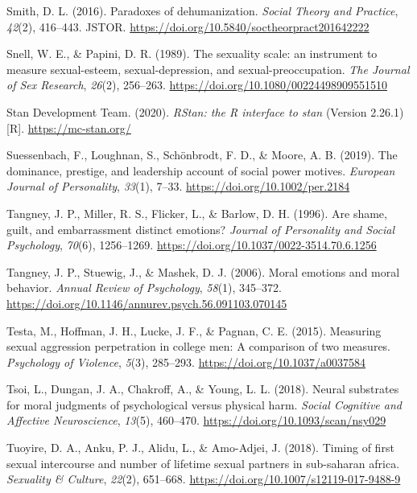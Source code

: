\documentclass[
  donotrepeattitle,doc, 12pt, a4paper,floatsintext]{apa7}
\newlength{\cslhangindent}
\newlength{\cslentryspacingunit} %
\newenvironment{CSLReferences}[2] %
 {%
  \setlength{\parindent}{0pt}
  \ifodd #1
  \let\oldpar\par
  \def\par{\hangindent=\cslhangindent\oldpar}
  \fi
  \setlength{\parskip}{#2\cslentryspacingunit}
 }%
 {}
\begin{document}
\begin{CSLReferences}{1}{0}
\leavevmode{}%
Smith, D. L. (2016). Paradoxes of dehumanization. \emph{Social Theory and Practice}, \emph{42}(2), 416--443. JSTOR. \url{https://doi.org/10.5840/soctheorpract201642222}

\leavevmode{}%
Snell, W. E., \& Papini, D. R. (1989). The sexuality scale: an instrument to measure sexual-esteem, sexual-depression, and sexual-preoccupation. \emph{The Journal of Sex Research}, \emph{26}(2), 256--263. \url{https://doi.org/10.1080/00224498909551510}

\leavevmode{}%
Stan Development Team. (2020). \emph{RStan: the R interface to stan} (Version 2.26.1) {[}R{]}. \url{https://mc-stan.org/}

\leavevmode{}%
Suessenbach, F., Loughnan, S., Schönbrodt, F. D., \& Moore, A. B. (2019). The dominance, prestige, and leadership account of social power motives. \emph{European Journal of Personality}, \emph{33}(1), 7--33. \url{https://doi.org/10.1002/per.2184}

\leavevmode{}%
Tangney, J. P., Miller, R. S., Flicker, L., \& Barlow, D. H. (1996). Are shame, guilt, and embarrassment distinct emotions? \emph{Journal of Personality and Social Psychology}, \emph{70}(6), 1256--1269. \url{https://doi.org/10.1037/0022-3514.70.6.1256}

\leavevmode{}%
Tangney, J. P., Stuewig, J., \& Mashek, D. J. (2006). Moral emotions and moral behavior. \emph{Annual Review of Psychology}, \emph{58}(1), 345--372. \url{https://doi.org/10.1146/annurev.psych.56.091103.070145}

\leavevmode{}%
Testa, M., Hoffman, J. H., Lucke, J. F., \& Pagnan, C. E. (2015). Measuring sexual aggression perpetration in college men: A comparison of two measures. \emph{Psychology of Violence}, \emph{5}(3), 285--293. \url{https://doi.org/10.1037/a0037584}

\leavevmode{}%
Tsoi, L., Dungan, J. A., Chakroff, A., \& Young, L. L. (2018). Neural substrates for moral judgments of psychological versus physical harm. \emph{Social Cognitive and Affective Neuroscience}, \emph{13}(5), 460--470. \url{https://doi.org/10.1093/scan/nsy029}

\leavevmode{}%
Tuoyire, D. A., Anku, P. J., Alidu, L., \& Amo-Adjei, J. (2018). Timing of first sexual intercourse and number of lifetime sexual partners in sub-saharan africa. \emph{Sexuality \& Culture}, \emph{22}(2), 651--668. \url{https://doi.org/10.1007/s12119-017-9488-9}


\end{CSLReferences}
\end{document}
